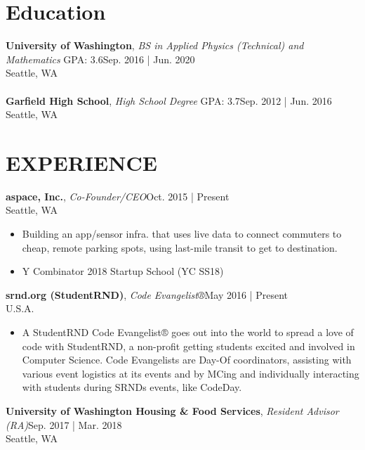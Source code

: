 \documentclass[line,margin]{res}
\begin{document}
\address{me@f3d0r.com | (206) 372-8476 | Seattle, Wa | f3d0r.com}
\begin{resume}
	\vspace{-5mm}
	        
	
	\section{Education}
	\textbf{University of Washington}, {\sl BS in Applied Physics (Technical) and Mathematics} GPA: 3.6\hfill Sep. 2016 | Jun. 2020\\Seattle, WA\\\\
	\textbf{Garfield High School}, {\sl High School Degree} GPA: 3.7\hfill Sep. 2012 | Jun. 2016\\Seattle, WA
	\section{EXPERIENCE}
	\textbf{aspace, Inc.}, {\sl Co-Founder/CEO}\hfill Oct. 2015 | Present\\Seattle, WA\\\begin{itemize} \itemsep 3pt
	\item Building an app/sensor infra. that uses live data to connect commuters to cheap, remote parking spots, using last-mile transit to get to destination.
	\item Y Combinator 2018 Startup School (YC SS18)
	\end{itemize}
	\textbf{srnd.org (StudentRND)}, {\sl Code Evangelist®}\hfill May 2016 | Present\\U.S.A.\\\begin{itemize} \itemsep 3pt
	\item A StudentRND Code Evangelist® goes out into the world to spread a love of code with StudentRND, a non-profit getting students excited and involved in Computer Science. Code Evangelists are Day-Of coordinators, assisting with various event logistics at it\textquotesingle{}s events and by MCing and individually interacting with students during SRND\textquotesingle{}s events, like CodeDay.
	\end{itemize}
	\textbf{University of Washington Housing \& Food Services}, {\sl Resident Advisor (RA)}\hfill Sep. 2017 | Mar. 2018\\Seattle, WA\\\begin{itemize} \itemsep 3pt

\end{itemize}
\end{resume}
\end{document}
